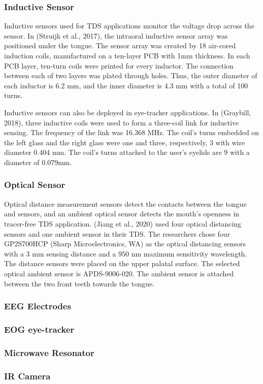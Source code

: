 \subsubsection{Inductive Sensor}
Inductive sensors used for TDS applications monitor the voltage drop across the sensor. In (Struijk et al., 2017), the intraoral inductive sensor array was positioned under the tongue. The sensor array was created by 18 air-cored induction coils, manufactured on a ten-layer PCB with 1mm thickness. In each PCB layer, ten-turn coils were printed for every inductor. The connection between each of two layers was plated through holes. Thus, the outer diameter of each inductor is 6.2 mm, and the inner diameter is 4.3 mm with a total of 100 turns. 

Inductive sensors can also be deployed in eye-tracker applications. In (Graybill, 2018), three inductive coils were used to form a three-coil link for inductive sensing. The frequency of the link was 16.368 MHz. The coil's turns embedded on the left glass and the right glass were one and three, respectively, 3 with wire diameter 0.404 mm. The coil's turns attached to the user's eyelids are 9 with a diameter of 0.079mm.

\subsubsection{Optical Sensor}
Optical distance measurement sensors detect the contacts between the tongue and sensors, and an ambient optical sensor detects the mouth's openness in tracer-free TDS application.  (Jiang et al., 2020) used four optical distancing sensors and one ambient sensor in their TDS. The researchers chose four GP2S700HCP (Sharp Microelectronics, WA) as the optical distancing sensors with a 3 mm sensing distance and a 950 nm maximum sensitivity wavelength. The distance sensors were placed on the upper palatal surface. The selected optical ambient sensor is APDS-9006-020. The ambient sensor is attached between the two front teeth towards the tongue.


\subsubsection{EEG Electrodes}

\subsubsection{EOG eye-tracker}

\subsubsection{Microwave Resonator}

\subsubsection{IR Camera}

